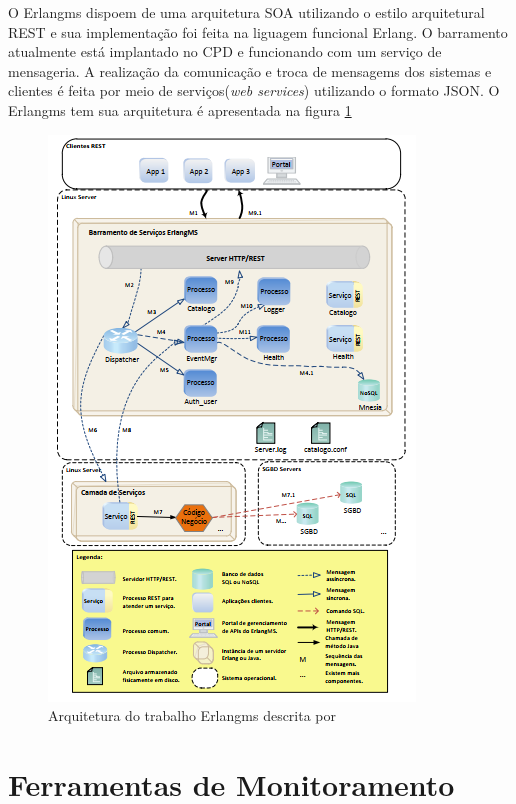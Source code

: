O Erlangms dispoem de uma arquitetura \acrshort{SOA} utilizando o estilo arquitetural \acrshort{REST} e sua implementação foi feita na liguagem funcional Erlang. O barramento atualmente está implantado no \acrshort{CPD} e  funcionando com um serviço de mensageria. A realização da comunicação e troca de mensagems dos sistemas e clientes é feita por meio de serviços(\textit{web services}) utilizando o formato \acrshort{JSON}. O Erlangms tem sua arquitetura é apresentada na figura \ref{fun:fig:erlangms}

\begin{figure}[h!]
	\begin{center}
	\includegraphics[scale = 1.20]{img/Arquitetura_ErlangMS.png}
		\caption{Arquitetura do trabalho Erlangms descrita por\cite{Agilar}}
		\label{fun:fig:erlangms}
	\end{center}
\end{figure}

\section{Ferramentas de Monitoramento}

